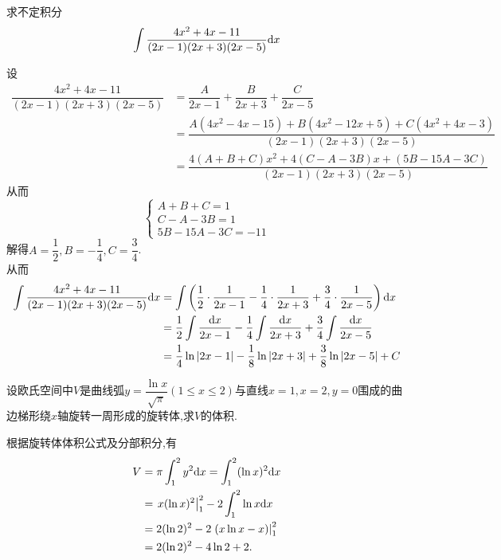 \documentclass{ctexart}
\begin{document}
\begin{problem}[5.(15\songti{分})]
    求不定积分$$\int{\dfrac{4x^2+4x-11}{(2x-1)(2x+3)(2x-5)}\mathrm{d}x}$$
\end{problem}
\begin{solution}
    设
    \begin{align*}
        \dfrac{4x^2+4x-11}{(2x-1)(2x+3)(2x-5)}
        &= \dfrac{A}{2x-1}+\dfrac{B}{2x+3}+\dfrac{C}{2x-5} \\
        &= \dfrac{A(4x^2-4x-15)+B(4x^2-12x+5)+C(4x^2+4x-3)}{(2x-1)(2x+3)(2x-5)} \\
        &= \dfrac{4(A+B+C)x^2+4(C-A-3B)x+(5B-15A-3C)}{(2x-1)(2x+3)(2x-5)}
    \end{align*}
    从而$$\left\{\begin{array}{l}
        A+B+C=1 \\
        C-A-3B=1 \\
        5B-15A-3C=-11
    \end{array}\right.$$
    解得$A=\dfrac{1}{2},B=-\dfrac{1}{4},C=\dfrac{3}{4}$.\\
    从而\begin{align*}
        \int{\dfrac{4x^2+4x-11}{(2x-1)(2x+3)(2x-5)}\mathrm{d}x}
        &= \int\left(\dfrac{1}{2}\cdot\dfrac{1}{2x-1}-\dfrac{1}{4}\cdot\dfrac{1}{2x+3}+\dfrac{3}{4}\cdot\dfrac{1}{2x-5}\right)\mathrm{d} x\\
        &= \dfrac{1}{2}\int{\dfrac{\mathrm{d}x}{2x-1}}-\dfrac{1}{4}\int{\dfrac{\mathrm{d}x}{2x+3}}+\dfrac{3}{4}\int{\dfrac{\mathrm{d}x}{2x-5}} \\
        &= \dfrac{1}{4}\ln{\left|2x-1\right|}-\dfrac{1}{8}\ln{\left|2x+3\right|}+\dfrac{3}{8}\ln{\left|2x-5\right|}+C
    \end{align*}
\end{solution}
\begin{problem}[6.(10\songti{分})]
    设欧氏空间中$V$是曲线弧$\displaystyle y=\dfrac{\ln{x}}{\sqrt{\pi}}(1\leqslant x\leqslant 2)$与直线$x=1,x=2,y=0$围成的曲边梯形绕$x$轴旋转一周形成的旋转体,求$V$的体积.
\end{problem}
\begin{solution}
根据旋转体体积公式及分部积分,有
    \[\begin{aligned}
        V&=\pi\int_1^2y^2\mathrm{d} x=\int_1^2(\ln x)^2\mathrm{d} x\\
         &=\left.x(\ln x)^2\right|_1^2-2\int_1^2\ln x\mathrm{d} x\\
         &=2(\ln2)^2-2\left.(x\ln x-x)\right|_1^2\\
         &=2(\ln2)^2-4\ln2+2.
    \end{aligned}\]
\end{solution}
\end{document}
